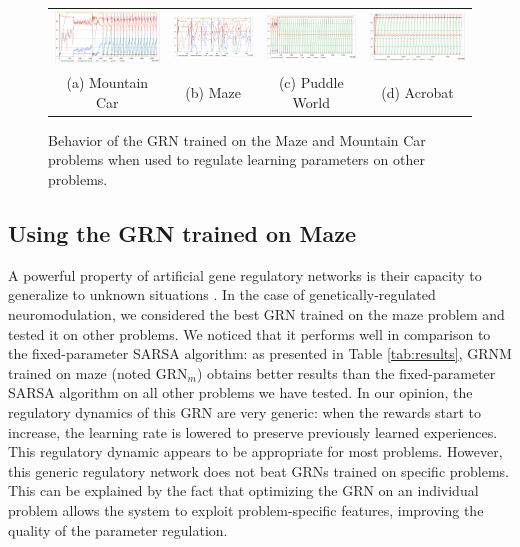 \begin{figure}[b!]
\center
\setlength{\tabcolsep}{0.5mm}
\begin{tabular}{cccc}
\includegraphics[width=0.245\linewidth]{MC_GRNGenericBehavior.pdf} &
\includegraphics[width=0.245\linewidth]{MZ_GRNGenericBehavior.pdf} &
\includegraphics[width=0.245\linewidth]{PW_GRNGenericBehavior.pdf} &
\includegraphics[width=0.245\linewidth]{ACP_GRNGenericBehavior.pdf} \\
(a) Mountain Car & (b) Maze & (c) Puddle World & (d) Acrobat
\end{tabular}
\caption{Behavior of the GRN trained on the Maze and Mountain Car problems when used to regulate learning parameters on other problems.}\label{fig:GRNGenericBehavior}
\end{figure}

\subsection{Using the GRN trained on Maze}
A powerful property of artificial gene regulatory networks is their capacity to generalize to unknown situations \cite{sanchez2014gene}. In the case of genetically-regulated neuromodulation, we considered the best GRN trained on the maze problem and tested it on other problems. We noticed that it performs well in comparison to the fixed-parameter SARSA algorithm: as presented in Table \ref{tab:results}, GRNM trained on maze (noted GRN$_{m}$) obtains better results than the fixed-parameter SARSA algorithm on all other problems we have tested. In our opinion, the regulatory dynamics of this GRN are very generic: when the rewards start to increase, the learning rate is lowered to preserve previously learned experiences. This regulatory dynamic appears to be appropriate for most problems. However, this generic regulatory network does not beat GRNs trained on specific problems. This can be explained by the fact that optimizing the GRN on an individual problem allows the system to exploit problem-specific features, improving the quality of the parameter regulation.

